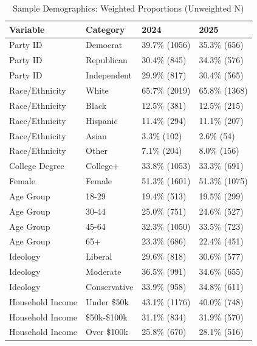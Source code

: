 \begin{table}[!h]
\centering
\caption{Sample Demographics: Weighted Proportions (Unweighted N)}
\label{tab:demographics}
\centering
\begin{tabular}[t]{llll}
\toprule
Variable & Category & 2024 & 2025\\
\midrule
Party ID & Democrat & 39.7\% (1056) & 35.3\% (656)\\
Party ID & Republican & 30.4\% (845) & 34.3\% (576)\\
Party ID & Independent & 29.9\% (817) & 30.4\% (565)\\
Race/Ethnicity & White & 65.7\% (2019) & 65.8\% (1368)\\
Race/Ethnicity & Black & 12.5\% (381) & 12.5\% (215)\\
Race/Ethnicity & Hispanic & 11.4\% (294) & 11.1\% (207)\\
Race/Ethnicity & Asian & 3.3\% (102) & 2.6\% (54)\\
Race/Ethnicity & Other & 7.1\% (204) & 8.0\% (156)\\
College Degree & College+ & 33.8\% (1053) & 33.3\% (691)\\
Female & Female & 51.3\% (1601) & 51.3\% (1075)\\
Age Group & 18-29 & 19.4\% (513) & 19.5\% (299)\\
Age Group & 30-44 & 25.0\% (751) & 24.6\% (527)\\
Age Group & 45-64 & 32.3\% (1050) & 33.5\% (723)\\
Age Group & 65+ & 23.3\% (686) & 22.4\% (451)\\
Ideology & Liberal & 29.6\% (818) & 30.6\% (577)\\
Ideology & Moderate & 36.5\% (991) & 34.6\% (655)\\
Ideology & Conservative & 33.9\% (958) & 34.8\% (611)\\
Household Income & Under \$50k & 43.1\% (1176) & 40.0\% (748)\\
Household Income & \$50k-\$100k & 31.1\% (834) & 31.9\% (570)\\
Household Income & Over \$100k & 25.8\% (670) & 28.1\% (516)\\
\bottomrule
\end{tabular}
\end{table}
